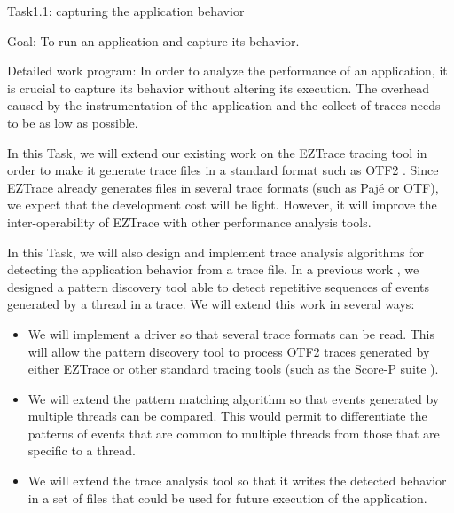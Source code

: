 \documentclass[a4paper,11pt,defblank]{article}
\begin{document}
\begin{paragraph}{Task1.1: capturing the application behavior}

\begin{paragraph}{Goal:}
To run an application and capture its behavior.
\end{paragraph}

\begin{paragraph}{Detailed work program:}
  In order to analyze the performance of an application, it is crucial
  to capture its behavior without altering its execution. The overhead
  caused by the instrumentation of the application and the collect of
  traces needs to be as low as possible.

  In this Task, we will extend our existing work on the EZTrace
  tracing tool \cite{eztrace} in order to make it generate trace files
  in a standard format such as OTF2 \cite{otf2}. Since EZTrace already
  generates files in several trace formats (such as Pajé or OTF), we
  expect that the development cost will be light. However, it will
  improve the inter-operability of EZTrace with other performance
  analysis tools.

  In this Task, we will also design and implement trace analysis
  algorithms for detecting the application behavior from a trace
  file. In a previous work \cite{eztrace_pdp}, we designed a pattern
  discovery tool able to detect repetitive sequences of events
  generated by a thread in a trace. We will extend this work in
  several ways:

  \begin{itemize}
  \item We will implement a driver so that several trace formats can
    be read. This will allow the pattern discovery tool to process
    OTF2 traces generated by either EZTrace or other standard tracing
    tools (such as the Score-P suite \cite{scorep}).

  \item We will extend the pattern matching algorithm so that events
    generated by multiple threads can be compared. This would permit
    to differentiate the patterns of events that are common to
    multiple threads from those that are specific to a thread.

  \item We will extend the trace analysis tool so that it writes the
    detected behavior in a set of files that could be used for future
    execution of the application.
  \end{itemize}


\end{paragraph}
\end{paragraph}
\end{document}
